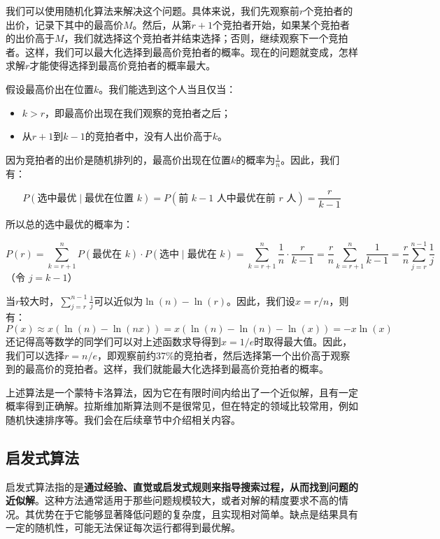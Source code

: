 \begin{answer}
    我们可以使用随机化算法来解决这个问题。具体来说，我们先观察前$r$个竞拍者的出价，记录下其中的最高价$M$。然后，从第$r+1$个竞拍者开始，如果某个竞拍者的出价高于$M$，我们就选择这个竞拍者并结束选择；否则，继续观察下一个竞拍者。这样，我们可以最大化选择到最高价竞拍者的概率。现在的问题就变成，怎样求解$r$才能使得选择到最高价竞拍者的概率最大。

    假设最高价出在位置$k$。我们能选到这个人当且仅当：
    \begin{itemize}
        \item $k > r$，即最高价出现在我们观察的竞拍者之后；
        \item 从$r+1$到$k-1$的竞拍者中，没有人出价高于$k$。
    \end{itemize}
    因为竞拍者的出价是随机排列的，最高价出现在位置$k$的概率为$\frac{1}{n}$。因此，我们有：

    \[
        P(\text{选中最优} \mid \text{最优在位置 } k) = P(\text{前 } k-1 \text{ 人中最优在前 } r \text{ 人}) = \frac{r}{k-1}
    \]

    所以总的选中最优的概率为：

    \[
        P(r) = \sum_{k=r+1}^n P(\text{最优在 } k) \cdot P(\text{选中} \mid \text{最优在 } k)
        = \sum_{k=r+1}^n \frac{1}{n} \cdot \frac{r}{k-1}
        = \frac{r}{n} \sum_{k=r+1}^n \frac{1}{k-1}
        = \frac{r}{n} \sum_{j=r}^{n-1} \frac{1}{j}
    \]
    （令 \( j = k-1 \)）

    当$r$较大时，$\sum_{j=r}^{n-1} \frac{1}{j}$可以近似为$\ln(n) - \ln(r)$。因此，我们设$x=r/n$，则有：
    \[
        P(x) \approx x (\ln(n) - \ln(nx)) = x (\ln(n) - \ln(n) - \ln(x)) = -x \ln(x)
    \]
    还记得高等数学的同学们可以对上述函数求导得到$x = 1/e$时取得最大值。因此，我们可以选择$r = n/e$，即观察前约37\%的竞拍者，然后选择第一个出价高于观察到的最高价的竞拍者。这样，我们就能最大化选择到最高价竞拍者的概率。
\end{answer}

上述算法是一个蒙特卡洛算法，因为它在有限时间内给出了一个近似解，且有一定概率得到正确解。拉斯维加斯算法则不是很常见，但在特定的领域比较常用，例如随机快速排序等。我们会在后续章节中介绍相关内容。

\subsection{启发式算法}

启发式算法指的是\textbf{通过经验、直觉或启发式规则来指导搜索过程，从而找到问题的近似解}。这种方法通常适用于那些问题规模较大，或者对解的精度要求不高的情况。其优势在于它能够显著降低问题的复杂度，且实现相对简单。缺点是结果具有一定的随机性，可能无法保证每次运行都得到最优解。

